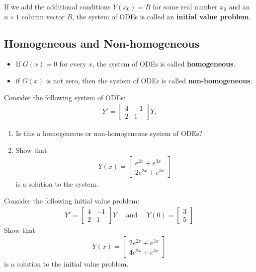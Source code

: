 \documentclass[12pt,a4paper]{article}
\newcounter{example}[section]
\begin{document}
If we add the additional conditions $Y (x_0) = B$ for some real number $x_0$ and an $n \times 1$ column vector $B$, the system of ODEs is called an \textbf{initial value problem}.
	
\subsection{Homogeneous and Non-homogeneous}
	\begin{itemize}
	\item If $G (x) = 0$ for every $x$, the system of ODEs is called \textbf{homogeneous}.
	\item if $G(x)$ is not zero, then the system of ODEs is called \textbf{non-homogeneous}.
	\end{itemize}
	
\newpage

\begin{example}
Consider the following system of ODEs:
	\begin{align*}
	Y' = \begin{bmatrix}
	4 & -1 \\ 2 & 1
	\end{bmatrix} Y .
	\end{align*}
	\begin{enumerate}
	\item Is this a homogeneous or non-homogeneous system of ODEs?
	\item Show that
		\begin{align*}
		Y (x) = \begin{bmatrix}
		e^{2x} + e^{3x} \\ 2e^{2x} + e^{3x}
		\end{bmatrix}
		\end{align*}
	is a solution to the system.
	\end{enumerate}
\end{example}

\vfill

\begin{example}
Consider the following initial value problem:
	\begin{align*}
	Y' = \begin{bmatrix}
	4 & -1 \\ 2 & 1
	\end{bmatrix} Y  \quad \text{ and } \quad Y(0) = \begin{bmatrix}
	3 \\ 5
	\end{bmatrix}
	\end{align*}
Show that
	\begin{align*}
	Y (x) = \begin{bmatrix}
	2e^{2x} + e^{3x} \\ 4e^{2x} + e^{3x}
	\end{bmatrix}
	\end{align*}
is a solution to the initial value problem.
\end{example}
\end{document}
